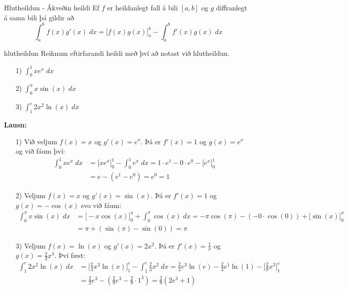 \begin{regla}{Hlutheildun - Ákveðin heildi}
Ef $f$ er heildanlegt fall á bili $[a,b]$ og $g$ diffranlegt á sama bili þá gildir að
$$
\int_{a}^{b} f(x)g'(x) \; dx = \Biggl[f(x)g(x)\Biggr]_{a}^{b} - \int_{a}^{b} f'(x)g(x)\;dx
$$
\end{regla}

\begin{syn}{hlutheildun}
Reiknum eftirfarandi heildi með því að notast við hlutheildun.
\begin{itemize}
\item[1)] $\displaystyle \int_{0}^{1} xe^{x} \; dx$

\item[2)] $\displaystyle \int_{0}^{\pi} x\sin(x) \; dx$

\item[3)] $\displaystyle \int_{1}^{e} 2x^{2}\ln(x) \; dx$
\end{itemize}

\vspace{2mm}

{\bf Lausn:}
\begin{itemize}
\item[1)] Við veljum $f(x) = x$ og $g'(x) = e^{x}$. Þá er $f'(x) = 1$ og $g(x) = e^{x}$ og við fáum því:
\setlength{\jot}{4mm}
\begin{align*}
\int_{0}^{1} xe^{x}\;dx &= \Biggl[xe^{x}\Biggr]_{0}^{1}-\int_{0}^{1}e^{x}\;dx = 1\cdot e^{1}-0\cdot e^{0} - \Biggl[e^{x}\Biggr]_{0}^{1}\\ &= e - \left(e^{1}-e^{0}\right) = e^{0} = 1
\end{align*}

\item[2)] Veljum $f(x) = x$ og $g'(x) = \sin(x)$. Þá er $f'(x) = 1$ og $g(x) = -\cos(x)$ svo við fáum:
\begin{align*}
\int_{0}^{\pi} x\sin(x) \; dx &= \Biggl[-x\cos(x)\Biggr]_{0}^{\pi} + \int_{0}^{\pi} \cos(x) \; dx = -\pi\cos(\pi)-(-0\cdot\cos(0)) + \Biggl[\sin(x)\Biggr]_{0}^{\pi}\\ &= \pi + (\sin(\pi)-\sin(0)) = \pi
\end{align*}

\item[3)] Veljum $f(x) = \ln(x)$ og $g'(x) = 2x^{2}$. Þá er $f'(x) = \frac{1}{x}$ og $g(x) = \frac{2}{3}x^{3}$. Því fæst:
\begin{align*}
\int_{1}^{e} 2x^{2}\ln(x) \; dx &= \Biggl[\frac{2}{3}x^{3}\ln(x)\Biggr]_{1}^{e} - \int_{1}^{e} \frac{2}{3}x^{2} \; dx = \frac{2}{3}e^{3}\ln(e)-\frac{2}{3}e^{1}\ln(1) - \Biggl[\frac{2}{9}x^{3}\Biggr]_{1}^{e}\\ &= \frac{2}{3}e^{3}-\left(\frac{2}{9}e^{3}-\frac{2}{9}\cdot 1^{3}\right) = \frac{2}{9}\left(2e^{3}+1\right)
\end{align*}
\end{itemize}

\end{syn}

